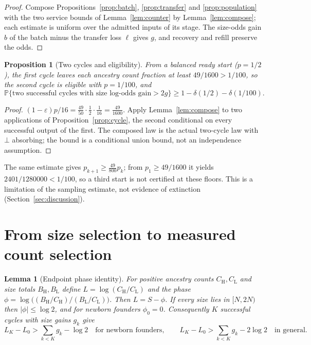 \documentclass[11pt,a4paper]{article}
\theoremstyle{plain}
\newtheorem{proposition}[theorem]{Proposition}
\newtheorem{lemma}[theorem]{Lemma}
\theoremstyle{definition}
\theoremstyle{remark}
\newcommand{\Prob}{\mathbb P}
\newcommand{\eps}{\varepsilon}
\newcommand{\lo}{\mathrm L}
\newcommand{\hi}{\mathrm H}
\newcommand{\fail}{\bot}
\begin{document}
\begin{proof}
Compose Propositions~\ref{prop:batch}, \ref{prop:transfer} and \ref{prop:population} with the two service bounds of Lemma~\ref{lem:counter} by Lemma~\ref{lem:compose}; each estimate is uniform over the admitted inputs of its stage. The size-odds gain $b$ of the batch minus the transfer loss $\ell$ gives $g$, and recovery and refill preserve the odds.
\end{proof}

\begin{proposition}[Two cycles and eligibility]\label{prop:two}
From a balanced ready start ($p=1/2$), the first cycle leaves each ancestry count fraction at least $49/1600>1/100$, so the second cycle is eligible with $p=1/100$, and
\begin{equation}\label{eq:composition}
\Prob\{\text{two successful cycles with size log-odds gain}>2g\}\ge1-\delta(1/2)-\delta(1/100).
\end{equation}
\end{proposition}

\begin{proof}
$(1-\eps)p/16=\frac{49}{50}\cdot\frac12\cdot\frac1{16}=\frac{49}{1600}$. Apply Lemma~\ref{lem:compose} to two applications of Proposition~\ref{prop:cycle}, the second conditional on every successful output of the first. The composed law is the actual two-cycle law with $\fail$ absorbing; the bound is a conditional union bound, not an independence assumption.
\end{proof}

The same estimate gives $p_{k+1}\ge\frac{49}{800}p_k$; from $p_1\ge49/1600$ it yields $2401/1280000<1/100$, so a third start is not certified at these floors. This is a limitation of the sampling estimate, not evidence of extinction (Section~\ref{sec:discussion}).

\section{From size selection to measured count selection}\label{sec:count}

\begin{lemma}[Endpoint phase identity]\label{lem:phase}
For positive ancestry counts $C_\hi,C_\lo$ and size totals $B_\hi,B_\lo$ define $L=\log(C_\hi/C_\lo)$ and the phase $\phi=\log\bigl((B_\hi/C_\hi)/(B_\lo/C_\lo)\bigr)$. Then $L=S-\phi$. If every size lies in $[N,2N)$ then $|\phi|\le\log2$, and for newborn founders $\phi_0=0$. Consequently $K$ successful cycles with size gains $g_k$ give
\[
L_K-L_0>\sum_{k<K}g_k-\log2\quad\text{for newborn founders},\qquad L_K-L_0>\sum_{k<K}g_k-2\log2\quad\text{in general}.
\]
\end{lemma}
\end{document}
